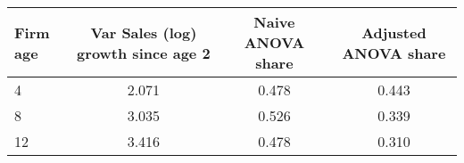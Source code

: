 \begin{tabular}{lccc}
Firm age & Var Sales (log) growth since age 2 & Naive ANOVA share & Adjusted ANOVA share \\
\hline
4 &     2.071 &  0.478 &  0.443 \\
8 &     3.035 &  0.526 &  0.339 \\
12 &     3.416 &  0.478 &  0.310 \\
\end{tabular}
